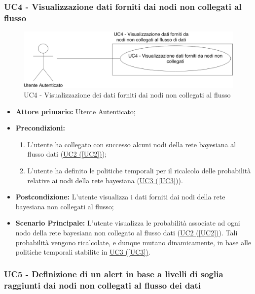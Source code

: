 \subsubsection{UC4 - Visualizzazione dati forniti dai nodi non collegati al flusso}\label{UC4}

\begin{figure}[H]
\centering
\includegraphics[scale=0.4]{./images/UC4.png}
\caption{UC4 - Visualizzazione dei dati forniti dai nodi non collegati al flusso}
\end{figure}

\begin{itemize}
\item \textbf{Attore primario:} Utente Autenticato;
\item \textbf{Precondizioni:}
	\begin{enumerate}
	\item L'utente ha collegato con successo alcuni nodi della rete bayesiana al flusso dati (\hyperref[UC2]{UC2 (\ref*{UC2})});
	\item L'utente ha definito le politiche temporali per il ricalcolo delle probabilità relative ai nodi della rete bayesiana (\hyperref[UC3]{UC3 (\ref*{UC3})}).
	\end{enumerate}
\item \textbf{Postcondizione:} L'utente visualizza i dati forniti dai nodi della rete bayesiana non collegati al flusso;
\item \textbf{Scenario Principale:} L'utente visualizza le probabilità associate ad ogni nodo della rete bayesiana non collegato al flusso dati (\hyperref[UC2]{UC2 (\ref*{UC2})}). Tali probabilità vengono ricalcolate, e dunque mutano dinamicamente, in base alle politiche temporali stabilite in \hyperref[UC3]{UC3 (\ref*{UC3})}.
\end{itemize}

\pagebreak

\subsubsection{UC5 - Definizione di un alert in base a livelli di soglia raggiunti dai nodi non collegati al flusso dei dati}\label{UC5}

